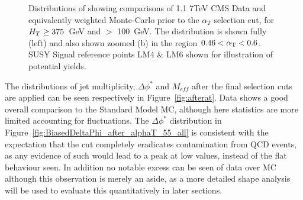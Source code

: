 \begin{figure}[htpb]
\centering
\begin{minipage}[b]{1.\textwidth}
\centering
{}
\hspace{0.2cm}
     \end{minipage}
    \caption{\label{fig:preselplotb}Distributions of \alt showing comparisons of 1.1  7TeV CMS Data and equivalently weighted Monte-Carlo prior to the $\alpha_{T}$ selection cut, for $H_{T} \geq 375$~GeV and \MHT $>$ 100~GeV. The \alt distribution is shown fully (left) and also shown zoomed (b) in the region $0.46 < \alpha_{\text{T}} < 0.6$. SUSY Signal reference points LM4 \& LM6 shown for illustration of potential yields.}
\end{figure}


The distributions of jet multiplicity, $\Delta \phi^{*}$ and $M_{eff}$ after the final selection cuts are applied can be seen respectively in Figure~\ref{fig:afterat}. Data shows a good overall comparison to the Standard Model MC, although here statistics are more limited accounting for fluctuations. The $\Delta \phi^{*}$ distribution in Figure~\ref{fig:BiasedDeltaPhi_after_alphaT_55_all} is consistent with the expectation that the \alt cut completely eradicates contamination from QCD events, as any evidence of such would lead to a peak at low values, instead of the flat behaviour seen. In addition no notable excess can be seen of data over MC although this observation is merely an aside, as a more detailed shape analysis will be used to evaluate this quantitatively in later sections.

